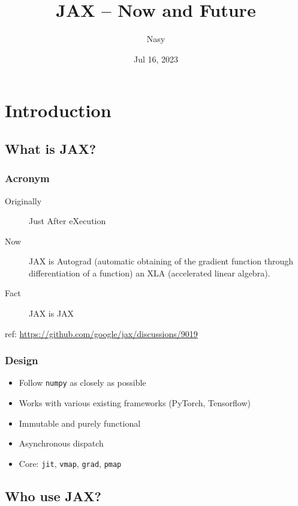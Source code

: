 \documentclass[11pt]{article}
\author{Nasy}
\date{Jul 16, 2023}
\title{JAX -- Now and Future}
\begin{document}
\maketitle
\setcounter{tocdepth}{1}
\tableofcontents

\section{Introduction}
\label{sec:org0383752}

\subsection{What is JAX?}
\label{sec:org3e21860}

\subsubsection{Acronym}
\label{sec:org8ac9489}

\begin{description}
\item[{Originally}] Just After eXecution
\item[{Now}] JAX is Autograd (automatic obtaining of the gradient function
through differentiation of a function) an XLA (accelerated linear
algebra).
\item[{Fact}] JAX is JAX
\end{description}

ref: \url{https://github.com/google/jax/discussions/9019}
\subsubsection{Design}
\label{sec:orgcbf11fa}

\begin{itemize}
\item Follow \texttt{numpy} as closely as possible
\item Works with various existing frameworks (PyTorch, Tensorflow)
\item Immutable and purely functional
\item Asynchronous dispatch
\item Core: \texttt{jit}, \texttt{vmap}, \texttt{grad}, \texttt{pmap}
\end{itemize}
\subsection{Who use JAX?}
\label{sec:org180bc9b}
\end{document}
